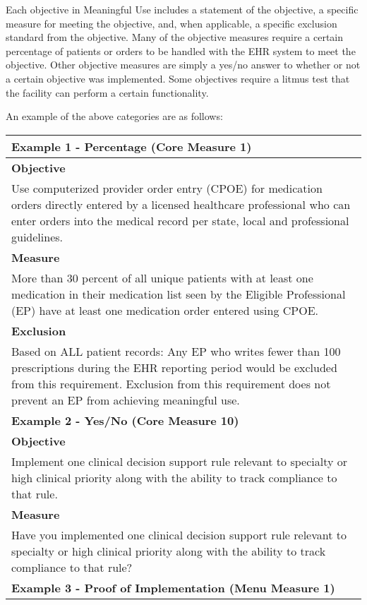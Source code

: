 \documentclass[10pt]{article}
\begin{document}
Each objective in Meaningful Use includes a statement of the objective, a specific measure for meeting the objective, and, when applicable, a specific exclusion standard from the objective.
Many of the objective measures require a certain percentage of patients or orders to be handled with the EHR system to meet the objective.
Other objective measures are simply a yes/no answer to whether or not a certain objective was implemented.
Some objectives require a litmus test that the facility can perform a certain functionality.

An example of the above categories are as follows:

\begin{center}
\begin{tabular}{ p{15cm} }
	\hline
	\hline
\textbf{Example 1 - Percentage (Core Measure 1)} \\
	\hline
\textbf{Objective} \\
Use computerized provider order entry (CPOE) for medication orders directly entered by a licensed healthcare professional who can enter orders into the medical record per state, local and professional guidelines. \\
\textbf{Measure} \\
More than 30 percent of all unique patients with at least one medication in their medication list seen by the Eligible Professional (EP) have at least one medication order entered using CPOE. \\
\textbf{Exclusion} \\
Based on ALL patient records: Any EP who writes fewer than 100 prescriptions during the EHR reporting period would be excluded from this requirement. Exclusion from  this requirement does not prevent an EP from achieving meaningful use. \\
	\hline
	\hline
\textbf{Example 2 - Yes/No (Core Measure 10)} \\
	\hline
\textbf{Objective} \\
Implement one clinical decision support rule relevant to specialty or high clinical priority along with the ability to track compliance to that rule. \\
\textbf{Measure} \\
Have you implemented one clinical decision support rule relevant to specialty or high clinical priority along with the ability to track compliance to that rule? \\
	\hline
	\hline
\textbf{Example 3 - Proof of Implementation (Menu Measure 1)} \\

\end{tabular}
\end{center}
\end{document}
